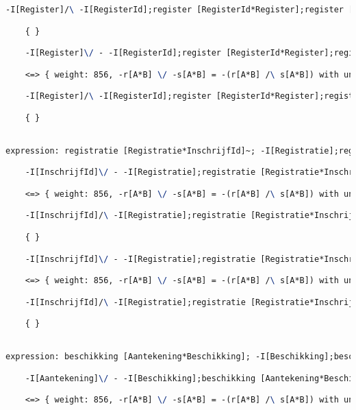\begin{lstlisting}[language=TeX]
    -I[Register]/\ -I[RegisterId];register [RegisterId*Register];register [RegisterId*Register]~

    { }

    -I[Register]\/ - -I[RegisterId];register [RegisterId*Register];register [RegisterId*Register]~

    <=> { weight: 856, -r[A*B] \/ -s[A*B] = -(r[A*B] /\ s[A*B]) with unifier: {A->I[Register], B->I[Register], r->I[Register], s->register [RegisterId*Register]~;-I[RegisterId];register [RegisterId*Register]} }

    -I[Register]/\ -I[RegisterId];register [RegisterId*Register];register [RegisterId*Register]~

    { }


expression: registratie [Registratie*InschrijfId]~; -I[Registratie];registratie [Registratie*InschrijfId] |- -I[InschrijfId]

    -I[InschrijfId]\/ - -I[Registratie];registratie [Registratie*InschrijfId];registratie [Registratie*InschrijfId]~

    <=> { weight: 856, -r[A*B] \/ -s[A*B] = -(r[A*B] /\ s[A*B]) with unifier: {A->I[InschrijfId], B->I[InschrijfId], r->registratie [Registratie*InschrijfId]~;-I[Registratie];registratie [Registratie*InschrijfId], s->I[InschrijfId]} }

    -I[InschrijfId]/\ -I[Registratie];registratie [Registratie*InschrijfId];registratie [Registratie*InschrijfId]~

    { }

    -I[InschrijfId]\/ - -I[Registratie];registratie [Registratie*InschrijfId];registratie [Registratie*InschrijfId]~

    <=> { weight: 856, -r[A*B] \/ -s[A*B] = -(r[A*B] /\ s[A*B]) with unifier: {A->I[InschrijfId], B->I[InschrijfId], r->I[InschrijfId], s->registratie [Registratie*InschrijfId]~;-I[Registratie];registratie [Registratie*InschrijfId]} }

    -I[InschrijfId]/\ -I[Registratie];registratie [Registratie*InschrijfId];registratie [Registratie*InschrijfId]~

    { }


expression: beschikking [Aantekening*Beschikking]; -I[Beschikking];beschikking [Aantekening*Beschikking]~ |- -I[Aantekening]

    -I[Aantekening]\/ - -I[Beschikking];beschikking [Aantekening*Beschikking]~;beschikking [Aantekening*Beschikking]

    <=> { weight: 856, -r[A*B] \/ -s[A*B] = -(r[A*B] /\ s[A*B]) with unifier: {A->I[Aantekening], B->I[Aantekening], r->beschikking [Aantekening*Beschikking];-I[Beschikking];beschikking [Aantekening*Beschikking]~, s->I[Aantekening]} }


\end{lstlisting}
